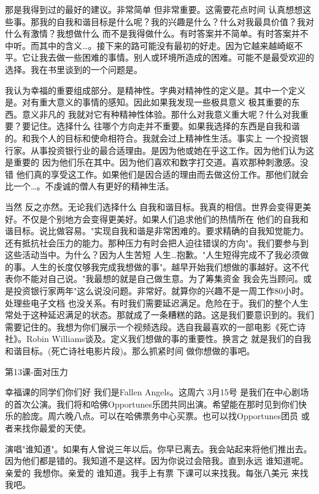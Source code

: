 那是我得到过的最好的建议。非常简单 但非常重要。这需要花点时间 认真想想这些事。那我的自我和谐目标是什么呢？我的兴趣是什么？什么对我最具价值？我对什么有激情？我想做什么 而不是我得做什么。有时答案并不简单。有时答案并不中听。而其中的含义…。接下来的路可能没有最初的好走。因为它越来越崎岖不平。它让我去做一些困难的事情。别人或环境所造成的困难。可能不是最受欢迎的选择。我在书里谈到的一个问题是。 

我认为幸福的重要组成部分。是精神性。字典对精神性的定义是。其中一个定义是。对有重大意义的事情的感知。因此如果我发现一些极具意义 极其重要的东西。意义非凡的 我就对它有种精神性体验。那什么对我意义重大呢？什么对我重要？要记住。选择什么 往哪个方向走并不重要。如果我选择的东西是自我和谐的。和我个人的目标和使命相符合。我就会过上精神性生活。事实上 一个投资银行家。从事投资银行业的最合适理由。是因为他或她在乎这工作。因为他们认为这是重要的 因为他们乐在其中。因为他们喜欢和数字打交道。喜欢那种刺激感。没错 他们真的享受这工作。如果他们是因合适的理由而去做这份工作。那他们就会比一个…。不虔诚的僧人有更好的精神生活。 

当然 反之亦然。无论我们选择什么 自我和谐目标。我真的相信。世界会变得更美好。不仅是个别地方会变得更美好。如果人们追求他们的热情所在 他们的自我和谐目标。说比做容易。"实现自我和谐是非常困难的。要求精确的自我知觉能力。还有抵抗社会压力的能力。那种压力有时会把人迫往错误的方向"。我们要参与到这些活动当中。为什么？因为人生苦短 人生…抱歉。"人生短得完成不了我必须做的事。人生的长度仅够我完成我想做的事"。越早开始我们想做的事越好。这不代表你不能对自己说。"我最想的就是自己做生意。为了筹集资金 我会先当顾问。或是投资银行家两年"这么说没问题。非常好。就算你的兴趣不是一周工作80小时。处理些电子文档 也没关系。有时我们需要延迟满足。危险在于。我们的整个人生常处于这种延迟满足的状态。那就成了一条糟糕的路。这是我们要意识到的。我们需要记住的。我想为你们展示一个视频选段。选自我最喜欢的一部电影《死亡诗社》。Robin Williams谈及。定义我们想做的事的重要性。换言之 就是我们的自我和谐目标。(死亡诗社电影片段)。那么抓紧时间 做你想做的事吧。 

第13课-面对压力 

幸福课的同学们你们好 我们是Fallen Angels。这周六 3月15号 是我们在中心剧场的首次公演。我们将和哈佛Opportunes乐团共同出演。希望能在那时见到你们快乐的脸庞。周六晚八点。可以在哈佛票务中心买票。也可以找Opportunes团员 或者来找你最爱的天使。 

演唱"谁知道"。如果有人曾说三年以后。你早已离去。我会站起来将他们推出去。因为他们都是错的。我知道不是这样。因为你说过会陪我。直到永远 谁知道呢。亲爱的 我想你。亲爱的 谁知道。我手上有票 下课可以来找我。每张八美元 来找我吧。 

